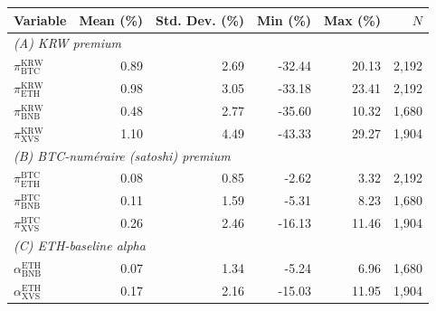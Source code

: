 \begin{tabular}{lrrrrr}
\toprule
Variable & Mean (\%) & Std. Dev. (\%) & Min (\%) & Max (\%) & $N$ \\
\midrule
\multicolumn{6}{l}{\emph{(A) KRW premium}} \\
\quad $\pi^{\text{KRW}}_{\text{BTC}}$ & 0.89 & 2.69 & -32.44 & 20.13 & 2,192 \\
\quad $\pi^{\text{KRW}}_{\text{ETH}}$ & 0.98 & 3.05 & -33.18 & 23.41 & 2,192 \\
\quad $\pi^{\text{KRW}}_{\text{BNB}}$ & 0.48 & 2.77 & -35.60 & 10.32 & 1,680 \\
\quad $\pi^{\text{KRW}}_{\text{XVS}}$ & 1.10 & 4.49 & -43.33 & 29.27 & 1,904 \\
\midrule\multicolumn{6}{l}{\emph{(B) BTC-num\'eraire (satoshi) premium}} \\
\quad $\pi^{\text{BTC}}_{\text{ETH}}$ & 0.08 & 0.85 & -2.62 & 3.32 & 2,192 \\
\quad $\pi^{\text{BTC}}_{\text{BNB}}$ & 0.11 & 1.59 & -5.31 & 8.23 & 1,680 \\
\quad $\pi^{\text{BTC}}_{\text{XVS}}$ & 0.26 & 2.46 & -16.13 & 11.46 & 1,904 \\
\midrule\multicolumn{6}{l}{\emph{(C) ETH-baseline alpha}} \\
\quad $\alpha^{\text{ETH}}_{\text{BNB}}$ & 0.07 & 1.34 & -5.24 & 6.96 & 1,680 \\
\quad $\alpha^{\text{ETH}}_{\text{XVS}}$ & 0.17 & 2.16 & -15.03 & 11.95 & 1,904 \\
\bottomrule
\end{tabular}